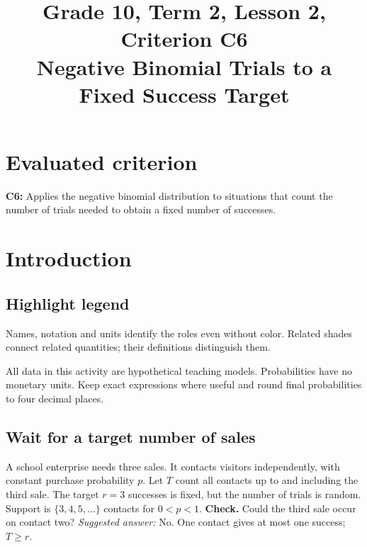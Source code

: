 \makeatletter
{}
\makeatother



\CoordinatedTermTwoPalette
\usepackage{needspace}
\setlength{\emergencystretch}{2em}
\title{Grade 10, Term 2, Lesson 2, Criterion C6\\Negative Binomial Trials to a Fixed Success Target}
\author{}
\date{}

\maketitle
\setcounter{tocdepth}{1}
\setcounter{secnumdepth}{2}
\label{toc}
\tableofcontents
\section*{Evaluated criterion}
\textbf{C6:} Applies the negative binomial distribution to situations that count the number of trials needed to obtain a fixed number of successes.
\section{Introduction}\label{sec:t2-c6-introduction}
\subsection*{Highlight legend}
\label{tab:highlight-legend}
Names, notation and units identify the roles even without color. Related shades connect related quantities; their definitions distinguish them.

All data in this activity are hypothetical teaching models. Probabilities have no monetary units. Keep exact expressions where useful and round final probabilities to four decimal places.
\subsection{Wait for a target number of sales}
A school enterprise needs three sales. It contacts visitors independently, with constant purchase probability $p$. Let $T$ count all contacts up to and including the third sale. The target $r=3$ successes is fixed, but the number of trials is random. Support is $\{3,4,5,\ldots\}$ contacts for $0<p<1$.
\textbf{Check.} Could the third sale occur on contact two? \emph{Suggested answer:} No. One contact gives at most one success; $T\geq r$.


